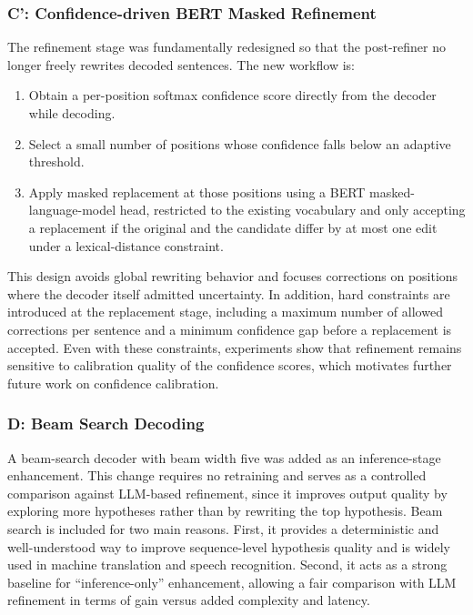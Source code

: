 \subsubsection{C': Confidence-driven BERT Masked Refinement}

The refinement stage was fundamentally redesigned so that the post-refiner no longer freely rewrites decoded sentences. The new workflow is:
\begin{enumerate}
    \item Obtain a per-position softmax confidence score directly from the decoder while decoding.
    \item Select a small number of positions whose confidence falls below an adaptive threshold.
    \item Apply masked replacement at those positions using a BERT masked-language-model head, restricted to the existing vocabulary and only accepting a replacement if the original and the candidate differ by at most one edit under a lexical-distance constraint.
\end{enumerate}

This design avoids global rewriting behavior and focuses corrections on positions where the decoder itself admitted uncertainty. In addition, hard constraints are introduced at the replacement stage, including a maximum number of allowed corrections per sentence and a minimum confidence gap before a replacement is accepted. Even with these constraints, experiments show that refinement remains sensitive to calibration quality of the confidence scores, which motivates further future work on confidence calibration.

\subsubsection{D: Beam Search Decoding}

A beam-search decoder with beam width five was added as an inference-stage enhancement. This change requires no retraining and serves as a controlled comparison against LLM-based refinement, since it improves output quality by exploring more hypotheses rather than by rewriting the top hypothesis. Beam search is included for two main reasons. First, it provides a deterministic and well-understood way to improve sequence-level hypothesis quality and is widely used in machine translation and speech recognition. Second, it acts as a strong baseline for “inference-only” enhancement, allowing a fair comparison with LLM refinement in terms of gain versus added complexity and latency.

